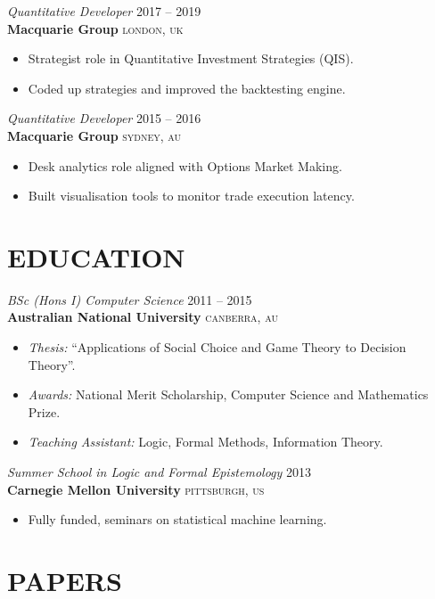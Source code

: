 \documentclass[line, margin]{res}
\begin{document}
\begin{resume}
{\sl Quantitative Developer} \hfill 2017 -- 2019\\
\textbf{Macquarie Group} \hfill \textsc{london, uk}
\vspace{4pt}
	\begin{itemize}
		\item Strategist role in Quantitative Investment Strategies (QIS).
		\item Coded up strategies and improved the backtesting engine.
	\end{itemize}

{\sl Quantitative Developer} \hfill 2015 -- 2016\\
\textbf{Macquarie Group} \hfill \textsc{sydney, au}
\vspace{4pt}
	\begin{itemize}
		\item Desk analytics role aligned with Options Market Making.
		\item Built visualisation tools to monitor trade execution latency.
	\end{itemize}

\section{EDUCATION}

{\sl BSc (Hons I) Computer Science}
	\hfill 2011 -- 2015\\
\textbf{Australian National University} \hfill \textsc{canberra, au}
\vspace{4pt}
	\begin{itemize}
\item {\sl Thesis:} ``Applications of Social Choice and Game Theory to Decision Theory''.
\item {\sl Awards:} National Merit Scholarship, Computer Science and Mathematics Prize.
\item {\sl Teaching Assistant:} Logic, Formal Methods, Information Theory.
	\end{itemize}

{\sl Summer School in Logic and Formal Epistemology} \hfill 2013\\
\textbf{Carnegie Mellon University} \hfill \textsc{pittsburgh, us}
\vspace{4pt}
	\begin{itemize}
		\item Fully funded, seminars on statistical machine learning.
	\end{itemize}

\section{PAPERS}


\end{resume}
\end{document}
